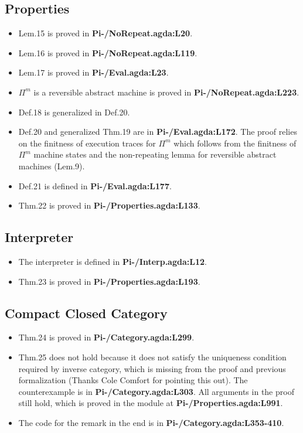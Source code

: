 \documentclass{article}
\begin{document}
\subsection{Properties}
\begin{itemize}
\item Lem.15 is proved in \textbf{Pi-/NoRepeat.agda:L20}.
\item Lem.16 is proved in \textbf{Pi-/NoRepeat.agda:L119}.
\item Lem.17 is proved in \textbf{Pi-/Eval.agda:L23}.
\item $\Pi^m$ is a reversible abstract machine is proved in \textbf{Pi-/NoRepeat.agda:L223}.
\item Def.18 is generalized in Def.20.
\item Def.20 and generalized Thm.19 are in
  \textbf{Pi-/Eval.agda:L172}. The proof relies on the finitness of
  execution traces  for $\Pi^m$ which follows from the finitness of
  $\Pi^m$ machine states and the non-repeating lemma for reversible abstract
  machines (Lem.9).
\item Def.21 is defined in \textbf{Pi-/Eval.agda:L177}.
\item Thm.22 is proved in \textbf{Pi-/Properties.agda:L133}.
\end{itemize}

\subsection{Interpreter}
\begin{itemize}
\item The interpreter is defined in \textbf{Pi-/Interp.agda:L12}.
\item Thm.23 is proved in \textbf{Pi-/Properties.agda:L193}.
\end{itemize}

\subsection{Compact Closed Category}
\begin{itemize}
\item Thm.24 is proved in \textbf{Pi-/Category.agda:L299}.
\item Thm.25 does not hold because it does not satisfy the uniqueness condition required by inverse category,
  which is missing from the proof and previous formalization (Thanks Cole Comfort for pointing this out).
  The counterexample is in \textbf{Pi-/Category.agda:L303}.
  All arguments in the proof still hold, which is proved in the module at \textbf{Pi-/Properties.agda:L991}.
\item The code for the remark in the end is in \textbf{Pi-/Category.agda:L353-410}.
\end{itemize}
\end{document}
